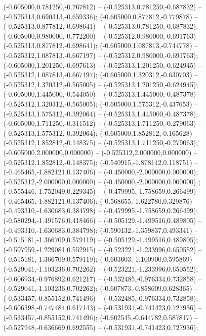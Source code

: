  (-0.605000,0.781250,-0.767812) -- (-0.525313,0.781250,-0.687832) -- (-0.525313,0.690313,-0.659336);
 (-0.605000,0.877812,-0.779878) -- (-0.525313,0.877812,-0.698641) -- (-0.525313,0.781250,-0.687832);
 (-0.605000,0.980000,-0.772200) -- (-0.525312,0.980000,-0.691763) -- (-0.525313,0.877812,-0.698641);
 (-0.605000,1.087813,-0.744778) -- (-0.525312,1.087813,-0.667197) -- (-0.525312,0.980000,-0.691763);
 (-0.605000,1.201250,-0.697613) -- (-0.525313,1.201250,-0.624945) -- (-0.525312,1.087813,-0.667197);
 (-0.605000,1.320312,-0.630703) -- (-0.525312,1.320312,-0.565005) -- (-0.525313,1.201250,-0.624945);
 (-0.605000,1.445000,-0.544050) -- (-0.525313,1.445000,-0.487378) -- (-0.525312,1.320312,-0.565005);
 (-0.605000,1.575312,-0.437653) -- (-0.525313,1.575312,-0.392064) -- (-0.525313,1.445000,-0.487378);
 (-0.605000,1.711250,-0.311512) -- (-0.525313,1.711250,-0.279063) -- (-0.525313,1.575312,-0.392064);
 (-0.605000,1.852812,-0.165628) -- (-0.525312,1.852812,-0.148375) -- (-0.525313,1.711250,-0.279063);
 (-0.605000,2.000000,0.000000) -- (-0.525312,2.000000,0.000000) -- (-0.525312,1.852812,-0.148375);
 (-0.540915,-1.878142,0.118751) -- (-0.465465,-1.882121,0.137406) -- (-0.450000,-2.000000,0.000000);
 (-0.525312,-2.000000,0.000000) -- (-0.450000,-2.000000,0.000000) ;
 (-0.555446,-1.752049,0.229345) -- (-0.479995,-1.758659,0.266499) -- (-0.465465,-1.882121,0.137406);
 (-0.568655,-1.622780,0.329876) -- (-0.493310,-1.630683,0.384798) -- (-0.479995,-1.758659,0.266499);
 (-0.580294,-1.491576,0.418466) -- (-0.505129,-1.499516,0.489805) -- (-0.493310,-1.630683,0.384798);
 (-0.590132,-1.359837,0.493341) -- (-0.515181,-1.366709,0.579119) -- (-0.505129,-1.499516,0.489805);
 (-0.597959,-1.229081,0.552915) -- (-0.523221,-1.233996,0.650552) -- (-0.515181,-1.366709,0.579119);
 (-0.603603,-1.100900,0.595869) -- (-0.529041,-1.103236,0.702262) -- (-0.523221,-1.233996,0.650552);
 (-0.606934,-0.976892,0.621217) -- (-0.532485,-0.976334,0.732858) -- (-0.529041,-1.103236,0.702262);
 (-0.607873,-0.858609,0.628365) -- (-0.533457,-0.855152,0.741496) -- (-0.532485,-0.976334,0.732858);
 (-0.606398,-0.747484,0.617143) -- (-0.531931,-0.741423,0.727936) -- (-0.533457,-0.855152,0.741496);
 (-0.602545,-0.644782,0.587817) -- (-0.527948,-0.636669,0.692555) -- (-0.531931,-0.741423,0.727936);
